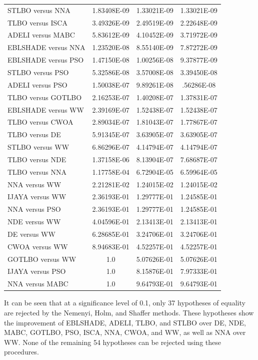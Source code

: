 \documentclass[a4paper,fleqn]{cas-sc}
\begin{document}
\begin{table}[<options>]
\begin{tabular*}{\tblwidth}{@{}LCCC@{}}
STLBO versus NNA&1.83408E-09&1.33021E-09&1.33021E-09\\
TLBO versus ISCA&3.49326E-09&2.49519E-09&2.22648E-09\\
ADELI versus MABC&5.83612E-09&4.10452E-09&3.71972E-09\\
EBLSHADE versus NNA&1.23520E-08&8.55140E-09&7.87272E-09\\
EBLSHADE versus PSO&1.47150E-08&1.00256E-08&9.37877E-09\\
STLBO versus PSO&5.32586E-08&3.57008E-08&3.39450E-08\\
ADELI versus PSO&1.50038E-07&9.89261E-08&.56286E-08\\
TLBO versus GOTLBO&2.16253E-07&1.40208E-07&1.37831E-07\\
EBLSHADE versus WW&2.39169E-07&1.52438E-07&1.52438E-07\\
TLBO versus CWOA&2.89034E-07&1.81043E-07&1.77867E-07\\
TLBO versus DE&5.91345E-07&3.63905E-07&3.63905E-07\\
STLBO versus WW&6.86296E-07&4.14794E-07&4.14794E-07\\
TLBO versus NDE&1.37158E-06&8.13904E-07&7.68687E-07\\
TLBO versus NNA&1.17758E-04&6.72904E-05&6.59964E-05\\
NNA versus WW&2.21281E-02&1.24015E-02&1.24015E-02\\
IJAYA versus WW&2.36193E-01&1.29777E-01&1.24585E-01\\
NNA versus PSO&2.36193E-01&1.29777E-01&1.24585E-01\\
NDE versus WW&4.04596E-01&2.13413E-01&2.13413E-01\\
DE versus WW&6.28685E-01&3.24706E-01&3.24706E-01\\
CWOA versus WW&8.94683E-01&4.52257E-01&4.52257E-01\\
GOTLBO versus WW&1.0&5.07626E-01&5.07626E-01\\
IJAYA versus PSO&1.0&8.15876E-01&7.97333E-01\\
NNA versus MABC&1.0&9.64793E-01&9.64793E-01\\
\bottomrule
\end{tabular*}
\end{table}



It can be seen that at a significance level of 0.1,
only 37 hypotheses of equality are rejected by the Nemenyi, Holm, and Shaffer methods.
These hypotheses show the improvement of EBLSHADE, ADELI, TLBO, and STLBO
over DE, NDE, MABC, GOTLBO, PSO, ISCA, NNA, CWOA, and WW,
as well as NNA over WW.
None of the remaining 54 hypotheses can be rejected using these procedures.
\end{document}
